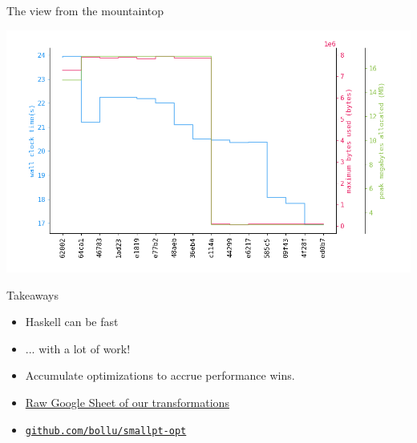 \documentclass[8pt]{beamer}
\begin{document}
\begin{frame}[fragile]{The view from the mountaintop}

\includegraphics[height=0.6\textwidth]{./perfdata-gen.png}

\end{frame}


\begin{frame}[fragile]{Takeaways}
\pause
\begin{itemize}
\item Haskell can be fast \pause
\item ... with a lot of work! \pause
\item Accumulate optimizations to accrue performance wins. \pause
\item \href{https://docs.google.com/spreadsheets/d/1YhZlDRGvnCtN8UQf_0ItmgRWI9MhL21HDTlBEKqgWHc/edit#gid=0}{Raw Google Sheet of our transformations}
\item \href{https://github.com/bollu/smallpths}{\texttt{github.com/bollu/smallpt-opt}}
\end{itemize}
\end{frame}
\end{document}
